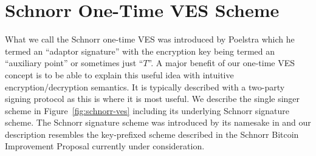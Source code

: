 \section{Schnorr One-Time VES Scheme}
What we call the Schnorr one-time VES was introduced by Poelstra \cite{poelstra2017scriptless} which he termed an ``adaptor signature''\cite{poelstra-adaptor} with the encryption key being termed an ``auxiliary point''\cite{blind-tumbler} or sometimes just ``$T$''. A major benefit of our one-time VES concept is to be able to explain this useful idea with intuitive encryption/decryption semantics. It is typically described with a two-party signing protocol as this is where it is most useful. We describe the single singer scheme in Figure~\ref{fig:schnorr-ves} including its underlying Schnorr signature scheme. The Schnorr signature scheme was introduced by its namesake in \cite{Schnorr:1989:EIS:646754.705037} and our description resembles the key-prefixed scheme described in the Schnorr Bitcoin Improvement Proposal\cite{bip-schnorr} currently under consideration.

